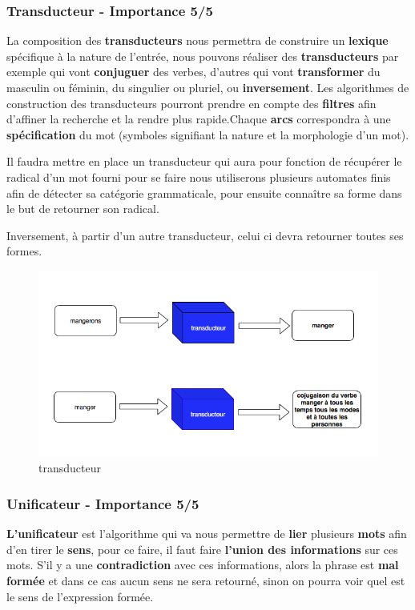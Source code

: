 \subsubsection{Transducteur - Importance 5/5}


La composition des \textbf{transducteurs} nous permettra de construire un \textbf{lexique} spécifique à la nature de l'entrée, nous pouvons réaliser des \textbf{transducteurs} par exemple qui vont \textbf{conjuguer} des verbes, d'autres qui vont \textbf{transformer} du masculin ou féminin, du singulier ou pluriel, ou \textbf{inversement}. Les algorithmes de construction des transducteurs pourront prendre en compte des \textbf{filtres} afin d'affiner la recherche et la rendre plus rapide.Chaque \textbf{arcs} correspondra à une \textbf{spécification} du mot (symboles signifiant la nature et la morphologie d'un mot).



{Il faudra mettre en place un transducteur qui aura pour fonction de récupérer le radical d'un mot fourni pour se faire nous utiliserons plusieurs automates finis afin de détecter sa catégorie grammaticale, pour ensuite connaître sa forme dans le but de retourner son radical.}

{Inversement, à partir d'un autre transducteur, celui ci devra retourner toutes ses formes.}

\begin{figure}[ht]
    \centering
    \includegraphics[scale=0.5]{transducteur.png}
    \caption{transducteur }
\end{figure}

\subsubsection{Unificateur - Importance 5/5}{
\textbf{L'unificateur} est l'algorithme qui va nous permettre de \textbf{lier} plusieurs \textbf{mots} afin d'en tirer le \textbf{sens}, pour ce faire, il faut faire \textbf{l'union des informations} sur ces mots. S'il y a une \textbf{contradiction} avec ces informations, alors la phrase est \textbf{mal formée} et dans ce cas aucun sens ne sera retourné, sinon on pourra voir quel est le sens de l'expression formée.\par}

